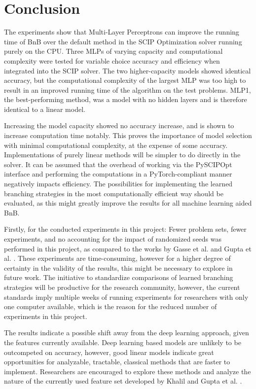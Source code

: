 \chapter{Conclusion}\label{cha:conclusion}

The experiments show that Multi-Layer Perceptrons can improve the running time of \gls{BnB} over the default method in the SCIP Optimization solver running purely on the CPU. Three \gls{MLP}s of varying capacity and computational complexity were tested for variable choice accuracy and efficiency when integrated into the SCIP solver. The two higher-capacity models showed identical accuracy, but the computational complexity of the largest \gls{MLP} was too high to result in an improved running time of the algorithm on the test problems. MLP1, the best-performing method, was a model with no hidden layers and is therefore identical to a linear model. 



Increasing the model capacity showed no accuracy increase, and is shown to increase computation time notably. This proves the importance of model selection with minimal computational complexity, at the expense of some accuracy. Implementations of purely linear methods will be simpler to do directly in the solver. It can be assumed that the overhead of working via the PySCIPOpt interface and performing the computations in a PyTorch-compliant manner negatively impacts efficiency. The possibilities for implementing the learned branching strategies in the most computationally efficient way should be evaluated, as this might greatly improve the results for all machine learning aided \gls{BnB}.  

Firstly, for the conducted experiments in this project: Fewer problem sets, fewer experiments, and no accounting for the impact of randomized seeds was performed in this project, as compared to the works by Gasse et al. \cite{gasse2019exact} and Gupta et al. \cite{gupta2020hybrid}. These experiments are time-consuming, however for a higher degree of certainty in the validity of the results, this might be necessary to explore in future work. The initiative to standardize comparisons of learned branching strategies will be productive for the research community, however, the current standards imply multiple weeks of running experiments for researchers with only one computer available, which is the reason for the reduced number of experiments in this project.   

The results indicate a possible shift away from the deep learning approach, given the features currently available. Deep learning based models are unlikely to be outcompeted on accuracy, however, good linear models indicate great opportunities for analyzable, tractable, classical methods that are faster to implement. Researchers are encouraged to explore these methods and analyze the nature of the currently used feature set developed by Khalil \cite{khalil2020towards} and Gupta et al. \cite{gupta2020hybrid}.

